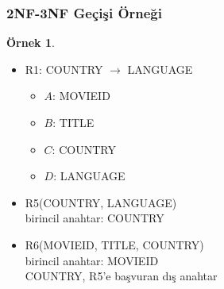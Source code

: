 \documentclass[dvipsnames]{beamer}
\theoremstyle{definition}
\theoremstyle{example}
\newtheorem{ornek}[theorem]{Örnek}
\theoremstyle{plain}
\begin{document}
\begin{frame}
  \frametitle{2NF-3NF Geçişi Örneği}

  \begin{ornek}
    \begin{itemize}
      \item R1: COUNTRY $\rightarrow$ LANGUAGE

      \pause
      \begin{itemize}
        \item $A$: MOVIEID
        \item $B$: TITLE
        \item $C$: COUNTRY
        \item $D$: LANGUAGE
      \end{itemize}
    \end{itemize}

    \pause
    \begin{itemize}
      \item R5(COUNTRY, LANGUAGE)\\
        birincil anahtar: COUNTRY

      \pause
      \item R6(MOVIEID, TITLE, COUNTRY)\\
        birincil anahtar: MOVIEID\\
        COUNTRY, R5'e başvuran dış anahtar
    \end{itemize}
  \end{ornek}
\end{frame}
\end{document}
